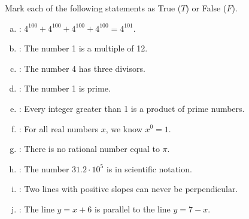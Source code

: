 \documentclass[12pt,letterpaper]{exam}
\begin{document}
\examtitle
{} 
\scores
\newpage

\begin{questions}

\question[10] Mark each  of the following statements as True ($T$) or False ($F$). \pspace
\begin{enumerate}[(a)]
\item \underline{\hspace{1.5cm}}: $4^{100} + 4^{100} + 4^{100} + 4^{100}= 4^{101}$. \vfill
\item \underline{\hspace{1.5cm}}: The number 1 is a multiple of 12. \vfill
\item \underline{\hspace{1.5cm}}: The number 4 has three divisors. \vfill
\item \underline{\hspace{1.5cm}}: The number 1 is prime. \vfill
\item \underline{\hspace{1.5cm}}: Every integer greater than 1 is a product of prime numbers. \vfill
\item \underline{\hspace{1.5cm}}: For all real numbers $x$, we know $x^0= 1$. \vfill
\item \underline{\hspace{1.5cm}}: There is no rational number equal to $\pi$. \vfill
\item \underline{\hspace{1.5cm}}: The number $31.2 \cdot 10^5$ is in scientific notation. \vfill
\item \underline{\hspace{1.5cm}}: Two lines with positive slopes can never be perpendicular. \vfill
\item \underline{\hspace{1.5cm}}: The line $y= x + 6$ is parallel to the line $y= 7 - x$. \vfill
\end{enumerate}



\newpage




\end{questions}
\end{document}
